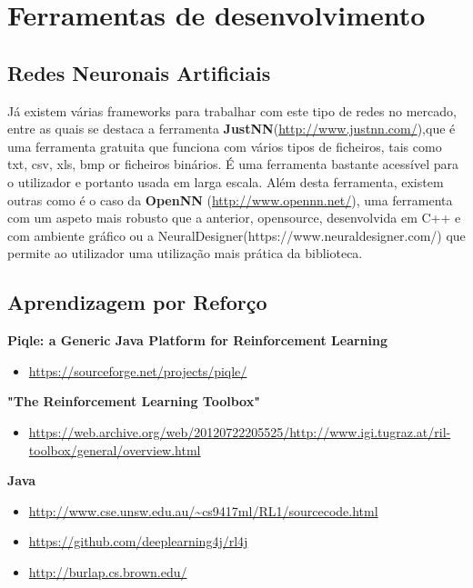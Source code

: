 \section{Ferramentas de desenvolvimento}\label{sec:Software}
\subsection{Redes Neuronais Artificiais}

Já existem várias frameworks para trabalhar com este tipo de redes no mercado, entre as quais se destaca a ferramenta \textbf{JustNN}(\url{http://www.justnn.com/}),que é uma ferramenta gratuita que funciona com vários tipos de ficheiros, tais como txt, csv, xls, bmp or ficheiros binários. É uma ferramenta bastante acessível para o utilizador e portanto usada em larga escala.
Além desta ferramenta, existem outras como é o caso da \textbf{OpenNN} (\url{http://www.opennn.net/}), uma ferramenta com um aspeto mais robusto que a anterior, opensource, desenvolvida em C++ e com ambiente gráfico ou a NeuralDesigner(https://www.neuraldesigner.com/) que permite ao utilizador uma utilização mais prática da biblioteca.










\subsection{Aprendizagem por Reforço}

\textbf{Piqle: a Generic Java Platform for Reinforcement Learning}

\begin{itemize}
\item \url{ https://sourceforge.net/projects/piqle/}
\end{itemize}

\textbf{"The Reinforcement Learning Toolbox"}

\begin{itemize}

\item \url{https://web.archive.org/web/20120722205525/http://www.igi.tugraz.at/ril-toolbox/general/overview.html}

\end{itemize}

\textbf{Java}

\begin{itemize}

\item \url{http://www.cse.unsw.edu.au/~cs9417ml/RL1/sourcecode.html}
\item \url{https://github.com/deeplearning4j/rl4j}
\item \url{http://burlap.cs.brown.edu/}

\end{itemize}


